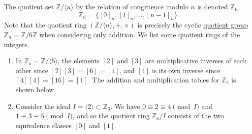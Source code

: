   \begin{example}
    \label{ex:quotient-rings-of-integers}
    The quotient set $\mathbb{Z}/\langle n \rangle$ by the relation of congruence modulo $n$ is denoted $\mathbb{Z}_{n}$. 
    \begin{equation}
      \mathbb{Z}_{n} = \{ [0]_{n}, [1]_{n}, \ldots, [n-1]_{n} \}
    \end{equation}
    Note that the quotient ring $(\mathbb{Z}/\langle n \rangle, +, \times)$ is precisely the cyclic \hyperref[def:quotient-group]{quotient group} $\mathbb{Z}_n = \mathbb{Z}/6\mathbb{Z}$ when considering only addition. We list some quotient rings of the integers. 
    \begin{enumerate}
      \item In $\mathbb{Z}_{5} = \mathbb{Z}/\langle 5 \rangle$, the elements $[2]$ and $[3]$ are multiplicative inverses of each other since $[2] [3] = [6] = [1]$, and $[4]$ is its own inverse since $[4] [4] = [16] = [1]$. The addition and multiplication tables for $\mathbb{Z}_5$ is shown below. 
      \item Consider the ideal $I = \langle 2 \rangle \subset \mathbb{Z}_6$. We have $0 \equiv 2 \equiv 4 \pmod{I}$ and $1 \equiv 3 \equiv 5 \pmod{I}$, and so the quotient ring $\mathbb{Z}_6 / I$ consists of the two equivalence classes $[0]$ and $[1]$. 
    \end{enumerate}
  \end{example}

